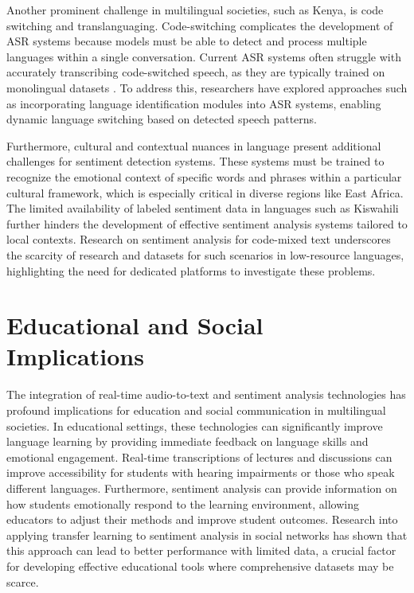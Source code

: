\noindent Another prominent challenge in multilingual societies, such as Kenya, is code switching and translanguaging. Code-switching complicates the development of ASR systems because models must be able to detect and process multiple languages within a single conversation. Current ASR systems often struggle with accurately transcribing code-switched speech, as they are typically trained on monolingual datasets \cite{s23229096}. To address this, researchers have explored approaches such as incorporating language identification modules into ASR systems, enabling dynamic language switching based on detected speech patterns.

\noindent Furthermore, cultural and contextual nuances in language present additional challenges for sentiment detection systems. These systems must be trained to recognize the emotional context of specific words and phrases within a particular cultural framework, which is especially critical in diverse regions like East Africa. The limited availability of labeled sentiment data in languages such as Kiswahili further hinders the development of effective sentiment analysis systems tailored to local contexts. Research on sentiment analysis for code-mixed text underscores the scarcity of research and datasets for such scenarios in low-resource languages, highlighting the need for dedicated platforms to investigate these problems.

\section{Educational and Social Implications}
The integration of real-time audio-to-text and sentiment analysis technologies has profound implications for education and social communication in multilingual societies. In educational settings, these technologies can significantly improve language learning by providing immediate feedback on language skills and emotional engagement. Real-time transcriptions of lectures and discussions can improve accessibility for students with hearing impairments or those who speak different languages. Furthermore, sentiment analysis can provide information on how students emotionally respond to the learning environment, allowing educators to adjust their methods and improve student outcomes. Research into applying transfer learning to sentiment analysis in social networks has shown that this approach can lead to better performance with limited data, a crucial factor for developing effective educational tools where comprehensive datasets may be scarce.

